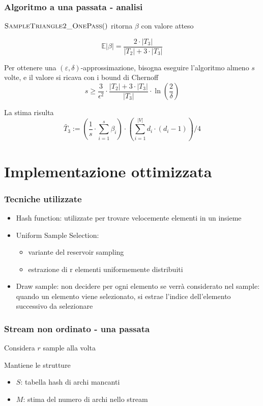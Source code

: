 \documentclass{beamer}
\begin{document}
\begin{frame}
\frametitle{Algoritmo a una passata - analisi}

$\Call{SampleTriangle2\_OnePass}{ }$ ritorna $\beta$ con valore atteso

\[
    \mathbb{E}|\beta|=\frac{2 \cdot \left|T_{3}\right|}{\left|T_{2}\right|+3 \cdot\left|T_{3}\right|}
\]

Per ottenere una $(\varepsilon, \delta)$-approssimazione, bisogna eseguire l'algoritmo almeno $s$ volte, e il valore si ricava con i bound di Chernoff
\[
    s \geq \frac{3}{\epsilon^{2}} \cdot \frac{\left|T_{2}\right|+3 \cdot\left|T_{3}\right|}{\left|T_{3}\right|} \cdot \ln \left(\frac{2}{\delta}\right)
\]

La stima risulta
\[
    \widetilde{T_{3}}:=\left(\frac{1}{s} \cdot \sum_{i=1}^{s} \beta_{i}\right) \cdot\left(\sum_{i=1}^{|V|} d_{i} \cdot\left(d_{i}-1\right)\right) / 4
\]

\end{frame}

\section{Implementazione ottimizzata}

\begin{frame}
\frametitle{Tecniche utilizzate}

\begin{itemize}
    \item Hash function:
utilizzate per trovare velocemente elementi in un insieme
    \item Uniform Sample Selection:
        \begin{itemize}
            \item variante del reservoir sampling
            \item estrazione di r elementi uniformemente distribuiti
        \end{itemize}
    \item Draw sample:
        non decidere per ogni elemento se verrà considerato nel sample:
        quando un elemento viene selezionato, si estrae l'indice dell'elemento successivo da selezionare
\end{itemize}
\end{frame}

\begin{frame}
\frametitle{Stream non ordinato - una passata}

Considera $r$ sample alla volta

Mantiene le strutture
\begin{itemize}
    \item $S$: tabella hash di archi mancanti
    \item $M$: stima del numero di archi nello stream
\end{itemize}

\end{frame}
\end{document}
